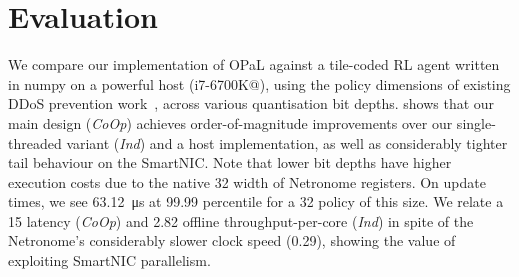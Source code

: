 \documentclass[
sigconf,natbib=false
]{acmart}
\newcommand{\approachshort}{OPaL}
\newcommand{\Coopfw}{\emph{CoOp}}
\newcommand{\coopfw}{\Coopfw}
\newcommand{\Indfw}{\emph{Ind}}
\newcommand{\indfw}{\Indfw}
\begin{document}
\section{Evaluation}
We compare our implementation of \approachshort{} against a tile-coded RL agent written in numpy on a powerful host (i7-6700K@), using the policy dimensions of existing DDoS prevention work~\parencite{DBLP:journals/tnsm/SimpsonRP20}, across various quantisation bit depths.
 shows that our main design (\coopfw) achieves order-of-magnitude improvements over our single-threaded variant (\indfw) and a host implementation, as well as considerably tighter tail behaviour on the SmartNIC.
Note that lower bit depths have higher execution costs due to the native \qty{32}{\bit} width of Netronome registers.
On update times, we see \qty{63.12}{\micro\second} at 99.99 percentile for a \qty{32}{\bit} policy of this size.
We relate a \qty{15}{\texttimes} latency (\coopfw) and \qty{2.82}{\texttimes} offline throughput-per-core (\indfw) in spite of the Netronome's considerably slower clock speed (\qty{0.29}{\texttimes}), showing the value of exploiting SmartNIC parallelism.
\end{document}
